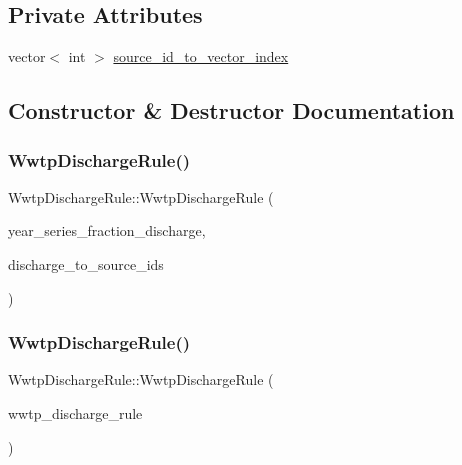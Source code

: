 \subsection*{Private Attributes}
\begin{DoxyCompactItemize}
\item 
vector$<$ int $>$ \mbox{\hyperlink{classWwtpDischargeRule_a99be200d8d3ccf1f95a8d6e84a225df1_a99be200d8d3ccf1f95a8d6e84a225df1}{source\+\_\+id\+\_\+to\+\_\+vector\+\_\+index}}
\end{DoxyCompactItemize}


\subsection{Constructor \& Destructor Documentation}
\mbox{\label{classWwtpDischargeRule_ae904657855c9d983ea0e5995109cd561_ae904657855c9d983ea0e5995109cd561}} 
\subsubsection{\texorpdfstring{Wwtp\+Discharge\+Rule()}{WwtpDischargeRule()}\hspace{0.1cm}{\footnotesize\ttfamily [1/2]}}
{\footnotesize\ttfamily Wwtp\+Discharge\+Rule\+::\+Wwtp\+Discharge\+Rule (\begin{DoxyParamCaption}\item[{vector$<$ vector$<$ double $>$$>$}]{year\+\_\+series\+\_\+fraction\+\_\+discharge,  }\item[{vector$<$ int $>$}]{discharge\+\_\+to\+\_\+source\+\_\+ids }\end{DoxyParamCaption})}

\mbox{\label{classWwtpDischargeRule_ac433e50df1414ba4bbb40022832b43ff_ac433e50df1414ba4bbb40022832b43ff}} 
\subsubsection{\texorpdfstring{Wwtp\+Discharge\+Rule()}{WwtpDischargeRule()}\hspace{0.1cm}{\footnotesize\ttfamily [2/2]}}
{\footnotesize\ttfamily Wwtp\+Discharge\+Rule\+::\+Wwtp\+Discharge\+Rule (\begin{DoxyParamCaption}\item[{\mbox{\hyperlink{classWwtpDischargeRule}{Wwtp\+Discharge\+Rule}} \&}]{wwtp\+\_\+discharge\+\_\+rule }\end{DoxyParamCaption})}



